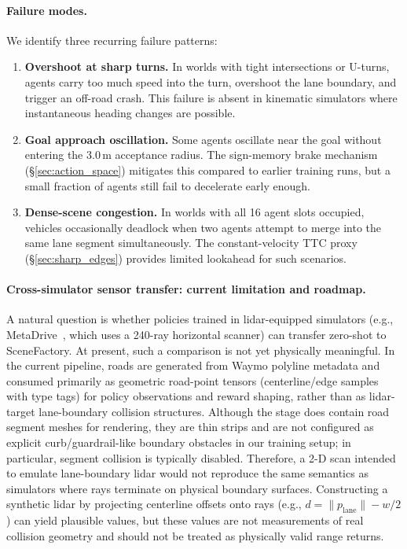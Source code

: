 \paragraph{Failure modes.}
We identify three recurring failure patterns:
\begin{enumerate}[leftmargin=*, itemsep=2pt]
  \item \textbf{Overshoot at sharp turns.}
        In worlds with tight intersections or U-turns, agents carry too much speed into the turn, overshoot the lane boundary, and trigger an off-road crash.
        This failure is absent in kinematic simulators where instantaneous heading changes are possible.
  \item \textbf{Goal approach oscillation.}
        Some agents oscillate near the goal without entering the 3.0\,m acceptance radius.
        The sign-memory brake mechanism (\S\ref{sec:action_space}) mitigates this compared to earlier training runs, but a small fraction of agents still fail to decelerate early enough.
  \item \textbf{Dense-scene congestion.}
        In worlds with all 16 agent slots occupied, vehicles occasionally deadlock when two agents attempt to merge into the same lane segment simultaneously.
        The constant-velocity TTC proxy (\S\ref{sec:sharp_edges}) provides limited lookahead for such scenarios.
\end{enumerate}


\paragraph{Cross-simulator sensor transfer: current limitation and roadmap.}
%
A natural question is whether policies trained in lidar-equipped simulators
(e.g., MetaDrive~\cite{li2022metadrive}, which uses a 240-ray horizontal scanner)
can transfer zero-shot to SceneFactory.
%
At present, such a comparison is not yet physically meaningful.
In the current pipeline, roads are generated from Waymo polyline metadata and consumed
primarily as geometric road-point tensors (centerline/edge samples with type tags) for
policy observations and reward shaping, rather than as lidar-target lane-boundary
collision structures.
%
Although the stage does contain road segment meshes for rendering, they are thin strips
and are not configured as explicit curb/guardrail-like boundary obstacles in our training
setup; in particular, segment collision is typically disabled.
Therefore, a 2-D scan intended to emulate lane-boundary lidar would not reproduce the
same semantics as simulators where rays terminate on physical boundary surfaces.
%
Constructing a synthetic lidar by projecting centerline offsets onto rays
(e.g., $d = \|p_{\mathrm{lane}}\| - w/2$) can yield plausible values, but these values are
not measurements of real collision geometry and should not be treated as physically valid
range returns.

